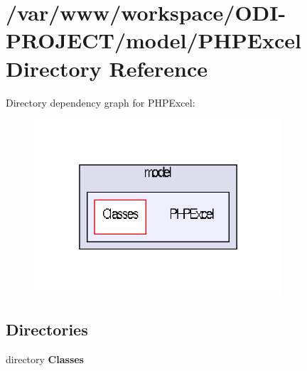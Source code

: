 \section{/var/www/workspace/\+O\+D\+I-\/\+P\+R\+O\+J\+E\+C\+T/model/\+P\+H\+P\+Excel Directory Reference}
\label{dir_80bce3a3f888786a61150878a51cbfab}
Directory dependency graph for P\+H\+P\+Excel\+:\nopagebreak
\begin{figure}[H]
\begin{center}
\leavevmode
\includegraphics[width=262pt]{dir_80bce3a3f888786a61150878a51cbfab_dep}
\end{center}
\end{figure}
\subsection*{Directories}
\begin{DoxyCompactItemize}
\item 
directory {\bf Classes}
\end{DoxyCompactItemize}
